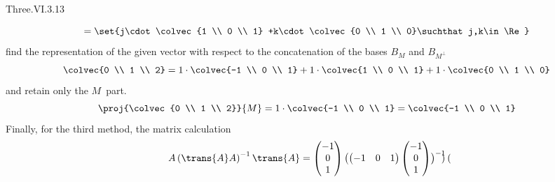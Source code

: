 \begin{ans}{Three.VI.3.13}
\begin{exparts}
\begin{equation*}
             =\set{j\cdot\colvec{1 \\ 0 \\ 1}
                   +k\cdot\colvec{0 \\ 1 \\ 0}\suchthat j,k\in\Re}
           \end{equation*}
           find the representation of the given vector with respect to the
           concatenation of the bases $B_M$ and $B_{M^\perp}$
           \begin{equation*}
             \colvec{0 \\ 1 \\ 2}
              =1\cdot\colvec{-1 \\ 0 \\ 1}
               +1\cdot\colvec{1 \\ 0 \\ 1}
               +1\cdot\colvec{0 \\ 1 \\ 0}
           \end{equation*}
           and retain only the $M$~part.
           \begin{equation*}
             \proj{\colvec{0 \\ 1 \\ 2}}{M}=1\cdot\colvec{-1 \\ 0 \\ 1}
                       =\colvec{-1 \\ 0 \\ 1}
           \end{equation*}
           Finally, for the third method, the matrix calculation
           \begin{multline*}
             A\left(\trans{A}A\right)^{-1}\trans{A}
             =
             \begin{pmatrix}
               -1 \\ 0  \\  1
             \end{pmatrix}
             \bigl(
               \begin{pmatrix}
                 -1  &0  &1
               \end{pmatrix}
               \begin{pmatrix}
                 -1  \\
                  0  \\
                  1
               \end{pmatrix}
             \bigr)^{-1}
             \begin{pmatrix}

\end{pmatrix}
\end{multline*}
\end{exparts}
\end{ans}
